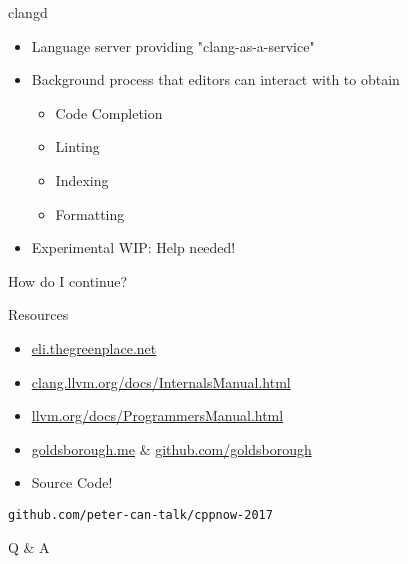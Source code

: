 
\begin{slide}{}
  {\Huge clangd}
  \begin{itemize}
    \item Language server providing "clang-as-a-service"
    \item Background process that editors can interact with to obtain
      \begin{itemize}
        \item Code Completion
        \item Linting
        \item Indexing
        \item Formatting
      \end{itemize}
    \item Experimental WIP: Help needed!
  \end{itemize}
\end{slide}

\begin{slide}{}
  \fontsize{32}{32}\selectfont
  \color{llvmblue}
  How do I continue?
\end{slide}

\begin{slide}{Resources}
  \begin{itemize}
      \item \url{eli.thegreenplace.net}
      \item \url{clang.llvm.org/docs/InternalsManual.html}
      \item \url{llvm.org/docs/ProgrammersManual.html}
      \item \url{goldsborough.me} \& \url{github.com/goldsborough}
      \item Source Code!
  \end{itemize}
  \pause
  \vspace{0.75cm}
  \texttt{github.com/peter-can-talk/cppnow-2017}
\end{slide}

\begin{slide}{}
  \vspace{0.5cm}
  \fontsize{48}{48}\selectfont
  \color{llvmblue}
  Q \& A
\end{slide}
